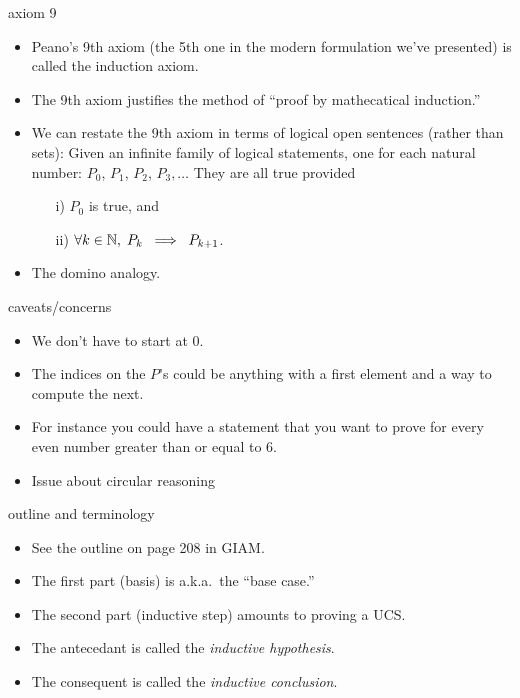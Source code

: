 \documentclass[handout,landscape]{beamer}
\begin{document}
\begin{frame}{axiom 9}
\begin{itemize}
\item Peano's 9th axiom (the 5th one in the modern formulation we've presented) is called the induction axiom. \pause
\item The 9th axiom justifies the method of ``proof by mathecatical induction.''  \pause
\item We can restate the 9th axiom in terms of logical open sentences (rather than sets): \pause \newline
Given an infinite family of logical statements, one for each natural number: $P_0$, $P_1$, $P_2$, $P_3, \ldots$ \pause \newline
They are all true provided
\begin{enumerate}
\item[i)] $P_0$ is true, and
\item[ii)]  $\forall k \in {\mathbb N}, \; P_k \; \implies \; P_{k+1}$.
\end{enumerate}
\pause
\item The domino analogy.
\end{itemize}
\end{frame}

\begin{frame}{caveats/concerns}
\begin{itemize}
\item We don't have to start at $0$. \pause
\item The indices on the $P$'s could be anything with a first element and a way to compute the next. \pause
\item For instance you could have a statement that you want to prove for every even number greater than or equal to 6. \pause
\item Issue about circular reasoning
\end{itemize}
\end{frame}

\begin{frame}{outline and terminology}
\begin{itemize}
\item See the outline on page 208 in GIAM. \pause
\item The first part (basis) is a.k.a.\ the ``base case.'' \pause
\item The second part (inductive step) amounts to proving a UCS. \pause
\item The antecedant is called the {\em inductive hypothesis}. \pause
\item The consequent is called the {\em inductive conclusion}.
\end{itemize}
\end{frame}
\end{document}

